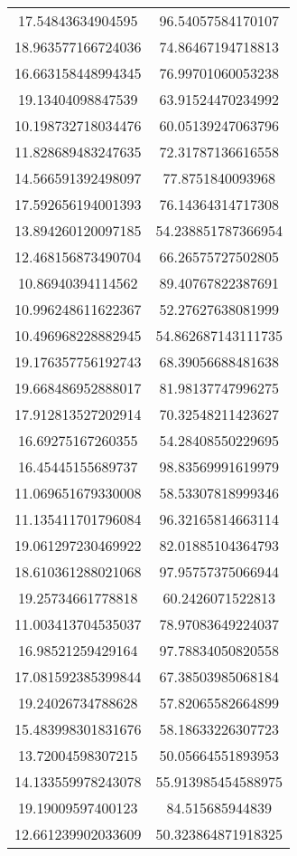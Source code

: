 \begin{table}
\begin{tabular}{cc}
17.54843634904595 & 96.54057584170107 \\
18.963577166724036 & 74.86467194718813 \\
16.663158448994345 & 76.99701060053238 \\
19.13404098847539 & 63.91524470234992 \\
10.198732718034476 & 60.05139247063796 \\
11.828689483247635 & 72.31787136616558 \\
14.566591392498097 & 77.8751840093968 \\
17.592656194001393 & 76.14364314717308 \\
13.894260120097185 & 54.238851787366954 \\
12.468156873490704 & 66.26575727502805 \\
10.86940394114562 & 89.40767822387691 \\
10.996248611622367 & 52.27627638081999 \\
10.496968228882945 & 54.862687143111735 \\
19.176357756192743 & 68.39056688481638 \\
19.668486952888017 & 81.98137747996275 \\
17.912813527202914 & 70.32548211423627 \\
16.69275167260355 & 54.28408550229695 \\
16.45445155689737 & 98.83569991619979 \\
11.069651679330008 & 58.53307818999346 \\
11.135411701796084 & 96.32165814663114 \\
19.061297230469922 & 82.01885104364793 \\
18.610361288021068 & 97.95757375066944 \\
19.25734661778818 & 60.2426071522813 \\
11.003413704535037 & 78.97083649224037 \\
16.98521259429164 & 97.78834050820558 \\
17.081592385399844 & 67.38503985068184 \\
19.24026734788628 & 57.82065582664899 \\
15.483998301831676 & 58.18633226307723 \\
13.72004598307215 & 50.05664551893953 \\
14.133559978243078 & 55.913985454588975 \\
19.19009597400123 & 84.515685944839 \\
12.661239902033609 & 50.323864871918325 \\

\end{tabular}
\end{table}

